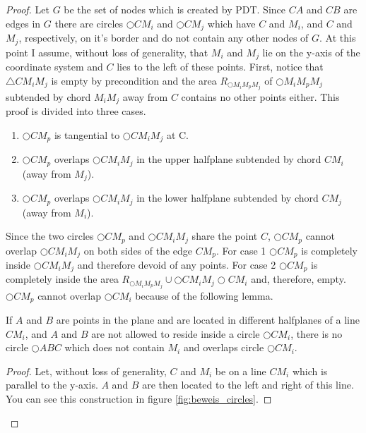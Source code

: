 \begin{proof}


Let $G $ be the set of nodes which is created by PDT. 
Since $CA $ and $CB $ are edges in $G $ there are circles $\bigcirc{CM_i} $ and $\bigcirc{CM_j} $ which have $C $ and $M_i $, and $C $ and $M_j $, respectively, on it's border and do not contain any other nodes of $G $. 
At this point I assume, without loss of generality, that $M_i $ and $M_j $ lie on the y-axis of the coordinate system and $C $ lies to the left of these points.
First, notice that $\triangle{CM_iM_j} $ is empty by precondition and the area $R_{\bigcirc{M_iM_pM_j}} $ of $\bigcirc{M_iM_pM_j} $ subtended by chord $M_iM_j $ away from $C $ contains no other points either.
This proof is divided into three cases.
\begin{enumerate}
\item $\bigcirc{CM_p} $ is tangential to $\bigcirc{CM_iM_j} $ at C.
\item $\bigcirc{CM_p} $ overlaps $\bigcirc{CM_iM_j} $ in the upper halfplane subtended by chord $CM_i $ (away from $M_j $).
\item $\bigcirc{CM_p} $ overlaps $\bigcirc{CM_iM_j} $ in the lower halfplane subtended by chord $CM_j $ (away from $M_i $).
\end{enumerate}
Since the two circles $\bigcirc{CM_p} $ and $\bigcirc{CM_iM_j} $ share the point $C $, $\bigcirc{CM_p} $ cannot overlap $\bigcirc{CM_iM_j} $ on both sides of the edge $CM_p $.
For case 1 $\bigcirc{CM_p} $ is completely inside $\bigcirc{CM_iM_j} $ and therefore devoid of any points.
For case 2 $\bigcirc{CM_p} $ is completely inside the area $R_{\bigcirc{M_iM_pM_j}} \cup \bigcirc{CM_iM_j} \bigcirc{CM_i} $ and, therefore, empty.
$\bigcirc{CM_p} $ cannot overlap $\bigcirc{CM_i} $ because of the following lemma.
\begin{lemma}
\label{circles}
If $A $ and $B $ are points in the plane and are located in different halfplanes of a line $CM_i $, and $A $ and $B $ are not allowed to reside inside a circle $\bigcirc{CM_i} $, there is no circle $\bigcirc{ABC} $ which does not contain $M_i $ and overlaps circle $\bigcirc{CM_i} $.
\end{lemma}
\begin{proof}
 Let, without loss of generality, $C $ and $M_i $ be on a line $CM_i $ which is parallel to the y-axis.
$A $ and $B $ are then located to the left and right of this line.
You can see this construction in figure \ref{fig:beweis_circles}.


\end{proof}
\end{proof}
